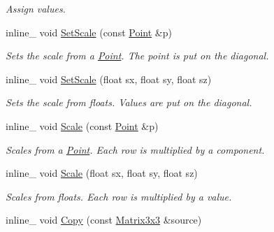 \begin{DoxyCompactItemize}
\begin{DoxyCompactList}\small\item\em Assign values. \end{DoxyCompactList}\item 
inline\+\_\+ void \hyperlink{classOpcode_1_1Matrix3x3_a60a046135adc98536f21848fe2433c71}{Set\+Scale} (const \hyperlink{classOpcode_1_1Point}{Point} \&p)\hypertarget{classOpcode_1_1Matrix3x3_a60a046135adc98536f21848fe2433c71}{}\label{classOpcode_1_1Matrix3x3_a60a046135adc98536f21848fe2433c71}

\begin{DoxyCompactList}\small\item\em Sets the scale from a \hyperlink{classOpcode_1_1Point}{Point}. The point is put on the diagonal. \end{DoxyCompactList}\item 
inline\+\_\+ void \hyperlink{classOpcode_1_1Matrix3x3_a0e79c5b8d3934b6a53144822c667d680}{Set\+Scale} (float sx, float sy, float sz)\hypertarget{classOpcode_1_1Matrix3x3_a0e79c5b8d3934b6a53144822c667d680}{}\label{classOpcode_1_1Matrix3x3_a0e79c5b8d3934b6a53144822c667d680}

\begin{DoxyCompactList}\small\item\em Sets the scale from floats. Values are put on the diagonal. \end{DoxyCompactList}\item 
inline\+\_\+ void \hyperlink{classOpcode_1_1Matrix3x3_a1029a35764fbf29454e8a42fd2811405}{Scale} (const \hyperlink{classOpcode_1_1Point}{Point} \&p)\hypertarget{classOpcode_1_1Matrix3x3_a1029a35764fbf29454e8a42fd2811405}{}\label{classOpcode_1_1Matrix3x3_a1029a35764fbf29454e8a42fd2811405}

\begin{DoxyCompactList}\small\item\em Scales from a \hyperlink{classOpcode_1_1Point}{Point}. Each row is multiplied by a component. \end{DoxyCompactList}\item 
inline\+\_\+ void \hyperlink{classOpcode_1_1Matrix3x3_a93cd78ce9960191422a843e0f6cf1a05}{Scale} (float sx, float sy, float sz)\hypertarget{classOpcode_1_1Matrix3x3_a93cd78ce9960191422a843e0f6cf1a05}{}\label{classOpcode_1_1Matrix3x3_a93cd78ce9960191422a843e0f6cf1a05}

\begin{DoxyCompactList}\small\item\em Scales from floats. Each row is multiplied by a value. \end{DoxyCompactList}\item 
inline\+\_\+ void \hyperlink{classOpcode_1_1Matrix3x3_afd18ca193bc803534976220eb9b6f667}{Copy} (const \hyperlink{classOpcode_1_1Matrix3x3}{Matrix3x3} \&source)\hypertarget{classOpcode_1_1Matrix3x3_afd18ca193bc803534976220eb9b6f667}{}\label{classOpcode_1_1Matrix3x3_afd18ca193bc803534976220eb9b6f667}


\end{DoxyCompactItemize}
